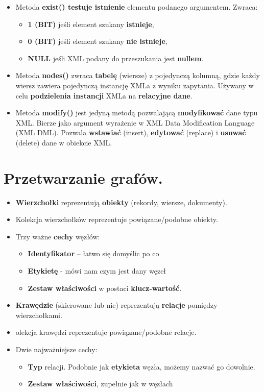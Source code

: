 \documentclass[a4paper]{article}
\begin{document}
\begin{itemize}
        \item Metoda \textbf{exist() testuje istnienie} elementu podanego argumentem. Zwraca:
        \begin{itemize}
            \item \textbf{1 (BIT)} jeśli element szukany \textbf{istnieje},
            \item \textbf{0 (BIT)} jeśli element szukany \textbf{nie istnieje},
            \item \textbf{NULL} jeśli XML podany do przeszukania jest \textbf{nullem}.
        \end{itemize}
        \item Metoda \textbf{nodes()} zwraca \textbf{tabelę} (wiersze) z pojedynczą kolumną, gdzie każdy wiersz zawiera pojedynczą instancję XMLa z wyniku zapytania. Używany w celu \textbf{podzielenia instancji} XMLa na \textbf{relacyjne dane}.
        \item Metoda \textbf{modify()} jest jedyną metodą pozwalającą \textbf{modyfikować} dane typu XML. Bierze jako argument wyrażenie w XML Data Modification Language (XML DML). Pozwala \textbf{wstawiać} (insert), \textbf{edytować} (replace) i \textbf{usuwać} (delete) dane w obiekcie XML.
    \end{itemize}


    \section{Przetwarzanie grafów.}
    \begin{itemize}
        \item \textbf{Wierzchołki} reprezentują \textbf{obiekty} (rekordy, wiersze, dokumenty).
        \item Kolekcja wierzchołków reprezentuje powiązane/podobne obiekty.
        \item Trzy ważne \textbf{cechy} węzłów:
        \begin{itemize}
            \item \textbf{Identyfikator} – łatwo się domyślic po co
            \item \textbf{Etykietę} - mówi nam czym jest dany węzeł
            \item \textbf{Zestaw właściwości} w postaci \textbf{klucz-wartość}.
        \end{itemize}

        \item \textbf{Krawędzie} (skierowane lub nie) reprezentują \textbf{relacje} pomiędzy wierzchołkami.
        \item olekcja krawędzi reprezentuje powiązane/podobne relacje.
        \item Dwie najważniejsze cechy:
        \begin{itemize}
            \item \textbf{Typ} relacji. Podobnie jak \textbf{etykieta} węzła, możemy nazwać go dowolnie.
            \item \textbf{Zestaw właściwości}, zupełnie jak w węzłach
        \end{itemize}
    \end{itemize}
\end{document}
